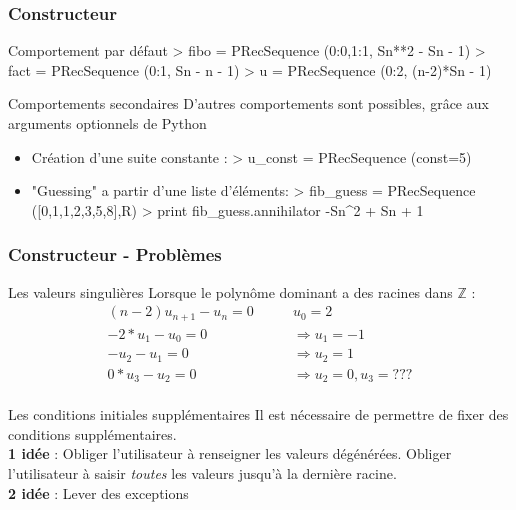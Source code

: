 \documentclass{beamer}
\newenvironment{repl}
 {\VerbatimEnvironment
  \let\FancyVerbFormatLine\shellformatline
  \Verbatim}
 {\endVerbatim}
\begin{document}

\begin{frame}[fragile]
\frametitle{Constructeur}
\begin{center}
\begin{exampleblock}{Comportement par défaut}
    \begin{repl}
> fibo = PRecSequence ({0:0,1:1}, Sn**2 - Sn - 1)
> fact = PRecSequence ({0:1}, Sn - n - 1)
> u = PRecSequence ({0:2}, (n-2)*Sn - 1)
    \end{repl}
\end{exampleblock}
\begin{block}{Comportements secondaires}
    D'autres comportements sont possibles, grâce aux arguments optionnels de Python
    \begin{itemize}
        \item Création d'une suite constante :
            \begin{repl}
> u_const = PRecSequence (const=5)
            \end{repl}
        \item "Guessing" a partir d'une liste d'éléments:
            \begin{repl}
> fib_guess = PRecSequence ([0,1,1,2,3,5,8],R)
> print fib_guess.annihilator
-Sn^2 + Sn + 1
            \end{repl}
    \end{itemize}
\end{block}
\end{center}
\end{frame}


\begin{frame}
\frametitle{Constructeur - Problèmes}
\begin{center}
\begin{alertblock}{Les valeurs singulières}
    Lorsque le polynôme dominant a des racines dans $\mathbb Z$ :
    \begin{align*}
        (n-2)u_{n+1} - u_n = 0 &\qquad u_0=2\\
        -2*u_1 - u_0 = 0 &\qquad\Rightarrow u_1 = -1\\
        -u_2 - u_1 = 0 &\qquad\Rightarrow u_2 = 1\\
        0*u_3 - u_2 = 0 &\qquad\Rightarrow u_2 = 0, u_3 =???\\
    \end{align*}
\end{alertblock}
\pause
\begin{exampleblock}{Les conditions initiales supplémentaires}
    Il est nécessaire de permettre de fixer des conditions supplémentaires.\\
    \pause
    \textbf{1\iere{} idée} : Obliger l'utilisateur à renseigner les valeurs dégénérées. Obliger 
    l'utilisateur à saisir \textit{toutes} les valeurs jusqu'à la dernière racine.\\
    \pause
    \textbf{2\ieme{} idée} : Lever des exceptions
\end{exampleblock}
\end{center}
\end{frame}
\end{document}
